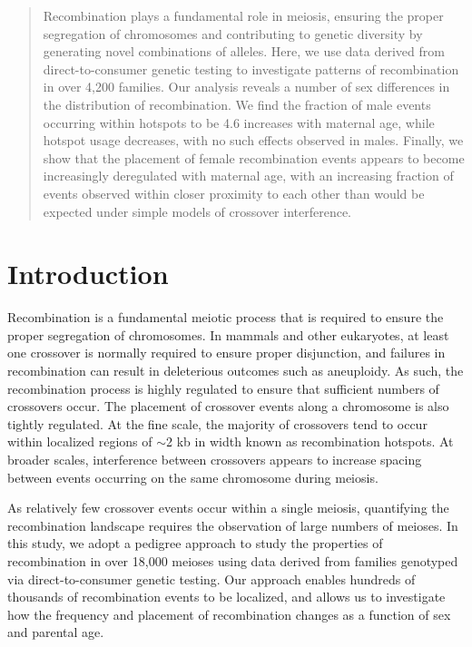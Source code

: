 
\begin{abstract}

Recombination plays a fundamental role in meiosis, ensuring the proper segregation of
chromosomes and contributing to genetic diversity by generating novel combinations of
alleles. Here, we use data derived from direct-to-consumer genetic testing to investigate
patterns of recombination in over 4,200 families. Our analysis reveals a number of sex
differences in the distribution of recombination. We find the fraction of male events occurring
within hotspots to be 4.6%
increases with maternal age, while hotspot usage decreases, with no such effects observed in
males. Finally, we show that the placement of female recombination events appears to
become increasingly deregulated with maternal age, with an increasing fraction of events
observed within closer proximity to each other than would be expected under simple models
of crossover interference.

\end{abstract}


\section{Introduction}

Recombination is a fundamental meiotic process that is
required to ensure the proper segregation of chromosomes.
In mammals and other eukaryotes, at least one crossover is
normally required to ensure proper disjunction, and failures in
recombination can result in deleterious outcomes such as
aneuploidy. As such, the recombination process is highly
regulated to ensure that sufficient numbers of crossovers occur.
The placement of crossover events along a chromosome is also
tightly regulated. At the fine scale, the majority of crossovers tend
to occur within localized regions of $\sim$2 kb in width known as
recombination hotspots. At broader scales, interference between
crossovers appears to increase spacing between events occurring
on the same chromosome during meiosis.

As relatively few crossover events occur within a single meiosis,
quantifying the recombination landscape requires the observation
of large numbers of meioses. In this study, we adopt a pedigree
approach to study the properties of recombination in over 18,000
meioses using data derived from families genotyped via 
direct-to-consumer genetic testing. Our approach enables hundreds of
thousands of recombination events to be localized, and allows us
to investigate how the frequency and placement of recombination
changes as a function of sex and parental age.

